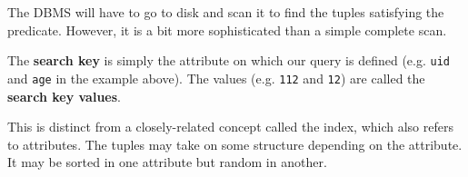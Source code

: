   The DBMS will have to go to disk and scan it to find the tuples satisfying the predicate. However, it is a bit more sophisticated than a simple complete scan. 

  \begin{definition}
    \label{def:search-key}
    The \textbf{search key} is simply the attribute on which our query is defined (e.g. \texttt{uid} and \texttt{age} in the example above). The values (e.g. \texttt{112} and \texttt{12}) are called the \textbf{search key values}. 
  \end{definition} 

  This is distinct from a closely-related concept called the index, which also refers to attributes. The tuples may take on some structure depending on the attribute. It may be sorted in one attribute but random in another. 

